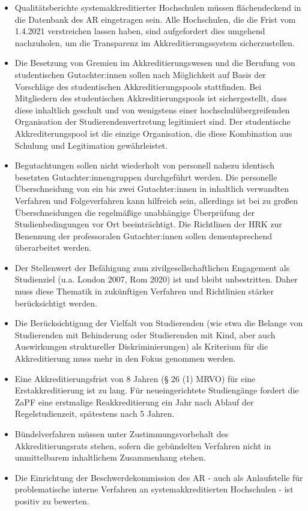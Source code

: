 \documentclass[DIV=calc]{scrartcl}
\let\oldgrqq=\grqq
\def\grqq{\oldgrqq\xspace}
\begin{document}
\begin{itemize}
	\item Qualitätsberichte systemakkreditierter Hochschulen müssen flächendeckend in die Datenbank des AR eingetragen sein. Alle Hochschulen, die die Frist vom 1.4.2021 verstreichen lassen haben, sind aufgefordert dies umgehend nachzuholen, um die Transparenz im Akkreditierungssystem sicherzustellen.
	
	\item Die Besetzung von Gremien im Akkreditierungswesen und die Berufung von studentischen Gutachter:innen sollen nach Möglichkeit auf Basis der Vorschläge des studentischen Akkreditierungspools stattfinden. Bei Mitgliedern des studentischen Akkreditierungspools ist sichergestellt, dass diese inhaltlich geschult und von wenigstens einer hochschulübergreifenden Organisation der Studierendenvertretung legitimiert sind. Der studentische Akkrediterungspool ist die einzige Organisation, die diese Kombination aus Schulung und Legitimation gewährleistet.
	
	\item Begutachtungen sollen nicht wiederholt von personell nahezu identisch besetzten Gutachter:innengruppen durchgeführt werden. Die personelle Überschneidung von ein bis zwei Gutachter:innen in inhaltlich verwandten Verfahren und Folgeverfahren kann hilfreich sein, allerdings ist bei zu großen Überschneidungen die regelmäßige unabhängige Überprüfung der Studienbedingungen vor Ort beeinträchtigt. Die Richtlinen der HRK zur Benennung der professoralen Gutachter:innen sollen dementsprechend überarbeitet werden.
	
	\item Der Stellenwert der \glqq Befähigung zum zivilgesellschaftlichen Engagement\grqq als Studienziel (u.a. London 2007, Rom 2020) ist und bleibt unbestritten. Daher muss diese Thematik in zukünftigen Verfahren und Richtlinien stärker berücksichtigt werden.
	
	\item Die Berücksichtigung der Vielfalt von Studierenden (wie etwa die Belange von Studierenden mit Behinderung oder Studierenden mit Kind, aber auch Auswirkungen struktureller Diskriminierungen) als Kriterium für die Akkreditierung muss mehr in den Fokus genommen werden. 
	
	\item Eine Akkreditierungsfrist von 8 Jahren (§ 26 (1) MRVO) für eine Erstakkreditierung ist zu lang. Für neueingerichtete Studiengänge fordert die ZaPF eine erstmalige Reakkreditierung ein Jahr nach Ablauf der Regelstudienzeit, spätestens nach 5 Jahren.
	
	\item Bündelverfahren müssen unter Zustimmungsvorbehalt des Akkreditierungsrats stehen, sofern die gebündelten Verfahren nicht in unmittelbarem inhaltlichem Zusammenhang stehen.
	
	\item Die Einrichtung der Beschwerdekommission des AR - auch als Anlaufstelle für problematische interne Verfahren an systemakkreditierten Hochschulen - ist positiv zu bewerten.
\end{itemize} 
\end{document}
